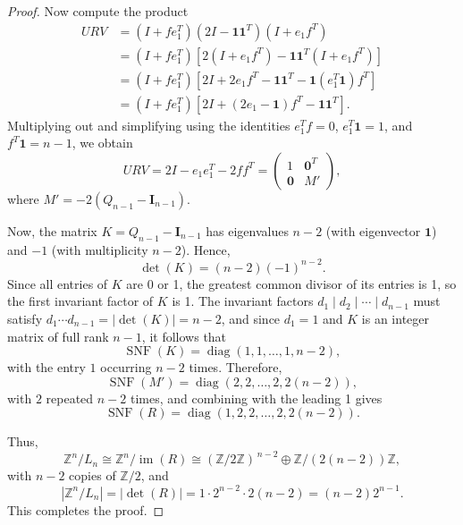 \documentclass[10pt,a4paper]{amsart}
\begin{document}
\begin{proof}
	Now compute the product
	\[
	\begin{aligned}
	URV &= (I + f e_1^T)(2I - \mathbf{1}\mathbf{1}^T)(I + e_1 f^T) \\
	&= (I + f e_1^T)\left[2(I + e_1 f^T) - \mathbf{1}\mathbf{1}^T(I + e_1 f^T)\right] \\
	&= (I + f e_1^T)\left[2I + 2e_1 f^T - \mathbf{1}\mathbf{1}^T - \mathbf{1}(e_1^T \mathbf{1}) f^T\right] \\
	&= (I + f e_1^T)\left[2I + (2e_1 - \mathbf{1})f^T - \mathbf{1}\mathbf{1}^T\right].
	\end{aligned}
	\]
	Multiplying out and simplifying using the identities \( e_1^T f = 0 \), \( e_1^T \mathbf{1} = 1 \), and \( f^T \mathbf{1} = n-1 \), we obtain
	\[
	URV = 2I - e_1 e_1^T - 2f f^T = \begin{pmatrix} 1 & \mathbf{0}^T \\ \mathbf{0} & M' \end{pmatrix},
	\]
	where \( M' = -2(Q_{n-1} - \boldsymbol{I}_{n-1}) \).
	
	Now, the matrix \( K = Q_{n-1} - \boldsymbol{I}_{n-1} \) has eigenvalues \( n-2 \) (with eigenvector \( \mathbf{1} \)) and \( -1 \) (with multiplicity \( n-2 \)). Hence,
	\[
	\det(K) = (n-2)(-1)^{n-2}.
	\]
	Since all entries of \( K \) are 0 or 1, the greatest common divisor of its entries is 1, so the first invariant factor of \( K \) is 1. The invariant factors \( d_1 \mid d_2 \mid \cdots \mid d_{n-1} \) must satisfy \( d_1 \cdots d_{n-1} = |\det(K)| = n-2 \), and since \( d_1 = 1 \) and $K$ is an integer matrix of full rank $n-1$, it follows that
	\[
	\operatorname{SNF}(K) = \operatorname{diag}(1, 1, \dots, 1, n-2),
	\]
	with the entry \(1\) occurring \( n-2 \) times. Therefore,
	\[
	\operatorname{SNF}(M') = \operatorname{diag}(2, 2, \dots, 2, 2(n-2)),
	\]
	with \( 2 \) repeated \(n - 2\) times, and combining with the leading 1 gives
	\[
	\operatorname{SNF}(R) = \operatorname{diag}(1, 2, 2, \dots, 2, 2(n-2)).
	\]
	
	Thus,
	\[
	\mathbb{Z}^n / L_n \cong \mathbb Z^n /  \operatorname{im}(R) \cong (\mathbb Z/2 \mathbb Z)^{\,n-2}  \oplus \mathbb{Z}/(2(n-2))\mathbb Z,
	\]
	with \( n-2 \) copies of \( \mathbb{Z}/2 \), and
	\[
	|\mathbb{Z}^n / L_n| = |\det(R)| = 1 \cdot 2^{n-2} \cdot 2(n-2) = (n-2)2^{n-1}.
	\]
	This completes the proof. 
	
\end{proof}
\end{document}
